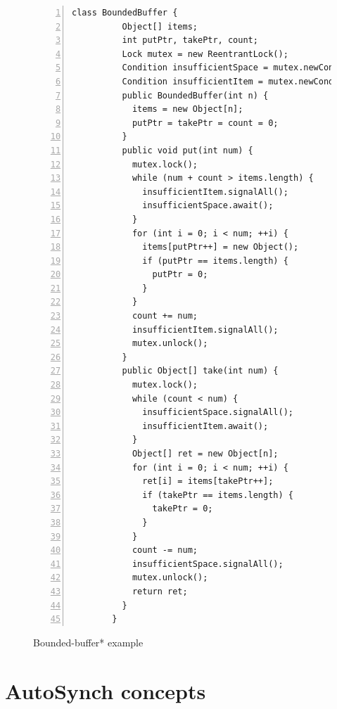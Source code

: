 \documentclass[preprint]{sigplanconf}
\begin{document}
\begin{figure}[ht!]
    \begin{Verbatim}[fontsize=\footnotesize,gobble=8,frame=lines,
            framesep=5mm,numbers=left,numbersep=2pt,
            label=\fbox{\small\emph{Explicit-Signal}}]
        class BoundedBuffer {
          Object[] items;  
          int putPtr, takePtr, count;
          Lock mutex = new ReentrantLock();
          Condition insufficientSpace = mutex.newCondition();
          Condition insufficientItem = mutex.newCondition();
          public BoundedBuffer(int n) {
            items = new Object[n];
            putPtr = takePtr = count = 0;
          }
          public void put(int num) {
            mutex.lock();
            while (num + count > items.length) {
              insufficientItem.signalAll();
              insufficientSpace.await();
            }
            for (int i = 0; i < num; ++i) {
              items[putPtr++] = new Object();
              if (putPtr == items.length) {
                putPtr = 0;
              }
            }
            count += num;
            insufficientItem.signalAll();
            mutex.unlock();
          }
          public Object[] take(int num) {
            mutex.lock();
            while (count < num) {
              insufficientSpace.signalAll();
              insufficientItem.await();
            }
            Object[] ret = new Object[n];
            for (int i = 0; i < num; ++i) {
              ret[i] = items[takePtr++];
              if (takePtr == items.length) {
                takePtr = 0;
              }
            }
            count -= num;
            insufficientSpace.signalAll();
            mutex.unlock();
            return ret;
          }
        }
    \end{Verbatim}
    \caption{Bounded-buffer* example}
    \label{fig:sigAll_exp}
\end{figure}


\section{AutoSynch concepts} \label{sec:concept}
\end{document}
